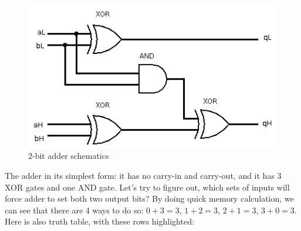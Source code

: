 \begin{figure}[ht!]
\centering
\includegraphics[scale=0.75]{adder/adder_logisim.png}
\caption{2-bit adder schematics}
\end{figure}

The adder in its simplest form: it has no carry-in and carry-out, and it has 3 XOR gates and one AND gate.
Let's try to figure out, which sets of inputs will force adder to set both two output bits?
By doing quick memory calculation, we can see that there are 4 ways to do so: $0+3=3$, $1+2=3$, $2+1=3$, $3+0=3$.
Here is also truth table, with these rows highlighted:

\newcommand{\HLcell}{\cellcolor{blue!25}}

